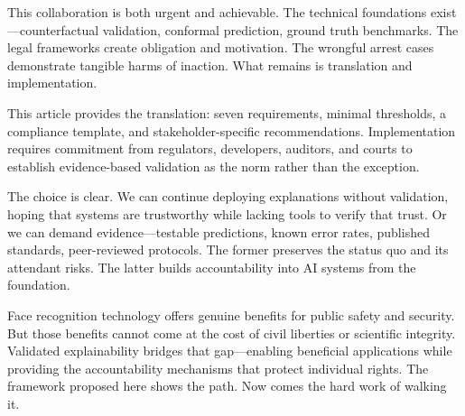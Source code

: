 This collaboration is both urgent and achievable. The technical foundations exist—counterfactual validation, conformal prediction, ground truth benchmarks. The legal frameworks create obligation and motivation. The wrongful arrest cases demonstrate tangible harms of inaction. What remains is translation and implementation.

This article provides the translation: seven requirements, minimal thresholds, a compliance template, and stakeholder-specific recommendations. Implementation requires commitment from regulators, developers, auditors, and courts to establish evidence-based validation as the norm rather than the exception.

The choice is clear. We can continue deploying explanations without validation, hoping that systems are trustworthy while lacking tools to verify that trust. Or we can demand evidence—testable predictions, known error rates, published standards, peer-reviewed protocols. The former preserves the status quo and its attendant risks. The latter builds accountability into AI systems from the foundation.

Face recognition technology offers genuine benefits for public safety and security. But those benefits cannot come at the cost of civil liberties or scientific integrity. Validated explainability bridges that gap—enabling beneficial applications while providing the accountability mechanisms that protect individual rights. The framework proposed here shows the path. Now comes the hard work of walking it.
